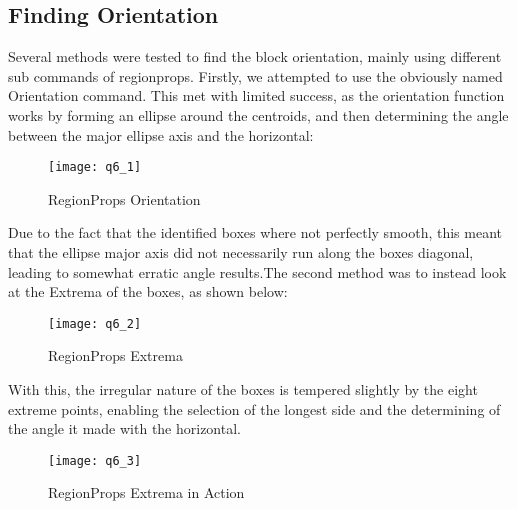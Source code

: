 	\subsection{Finding Orientation}
	\newline Several methods were tested to find the block orientation, mainly using different sub commands of regionprops. Firstly, we attempted to use the obviously named Orientation command. This met with limited success, as the orientation function works by forming an ellipse around the centroids, and then determining the angle between the major ellipse axis and the horizontal: \newline
	\begin{figure}[position = here]
		\begin{centering}
			\texttt{[image: q6\_1]}\\
			\caption[\textit{RPYAxes}]{RegionProps Orientation}
		\end{centering}
	\end{figure}
	\newline
	Due to the fact that the identified boxes where not perfectly smooth, this meant that the ellipse major axis did not necessarily run along the boxes diagonal, leading to somewhat erratic angle results.\newline \newline The second method was to instead look at the Extrema of the boxes, as shown below: \newline
	\begin{figure}[position = here]
		\begin{centering}
			\texttt{[image: q6\_2]}\\
			\caption[\textit{RPYAxes}]{RegionProps Extrema}
		\end{centering}
	\end{figure}
	\newline
	With this, the irregular nature of the boxes is tempered slightly by the eight extreme points, enabling the selection of the longest side and the determining of the angle it made with the horizontal.\newline
	\begin{figure}[position = here]
		\begin{centering}
			\texttt{[image: q6\_3]}\\
			\caption[\textit{RPYAxes}]{RegionProps Extrema in Action}
		\end{centering}
	\end{figure}
	\pagebreak
	\newline
